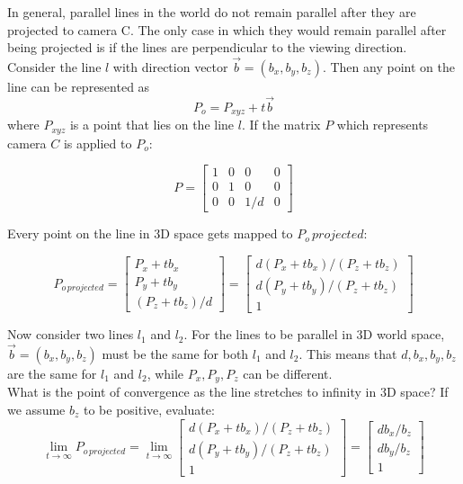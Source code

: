 \documentclass[a4paper,10pt]{scrartcl}
\begin{document}
In general, parallel lines in the world do not remain parallel after they are projected to camera C. The only
case in which they would remain parallel after being projected is if the lines are perpendicular to the viewing
direction. \\

Consider the line $l$ with direction vector $\vec b = (b_x, b_y, b_z)$. Then any point on the line can be represented as
\[ P_o = P_{xyz} + t\vec b\] where $P_{xyz}$ is a point that lies on the line $l$. If the matrix $P$ which represents
camera $C$ is applied to $P_o$:

\[ P = \begin{bmatrix} 1 & 0 & 0 & 0 \\ 0 & 1 & 0 & 0 \\ 0 & 0 & 1/d & 0 \end{bmatrix}\]

Every point on the line in 3D space gets mapped to $P_o\,projected$:

\[ P_{o\,projected} = \begin{bmatrix} P_x + tb_x\\ P_y + tb_y\\ (P_z + tb_z)/d \end{bmatrix}= \begin{bmatrix}  d(P_x + tb_x)/(P_z + tb_z)\\ d(P_y + tb_y)/(P_z + tb_z)\\1 \end{bmatrix}\]

Now consider two lines $l_1$ and $l_2$. For the lines to be parallel in 3D world space, $\vec b = (b_x, b_y, b_z)$ 
must be the same for both $l_1$ and $l_2$. This means that $d, b_x, b_y, b_z$ are the same for $l_1$ and $l_2$, while
$P_x, P_y, P_z$ can be different.\\

What is the point of convergence as the line stretches to infinity in 3D space? If we assume $b_z$ to be positive, evaluate:
\[ \lim_{t \to \infty} P_{o\,projected} = \lim_{t \to \infty} \begin{bmatrix}  d(P_x + tb_x)/(P_z + tb_z)\\ d(P_y + tb_y)/(P_z + tb_z)\\1 \end{bmatrix} =
  \begin{bmatrix} db_x/b_z \\ db_y/b_z \\ 1\end{bmatrix}\]
  
\end{document}
